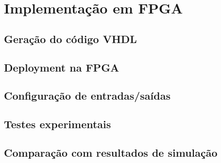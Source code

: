 \section{Implementação em FPGA}

\subsection{Geração do código VHDL}

\subsection{Deployment na FPGA}

\subsection{Configuração de entradas/saídas}

\subsection{Testes experimentais}

\subsection{Comparação com resultados de simulação}